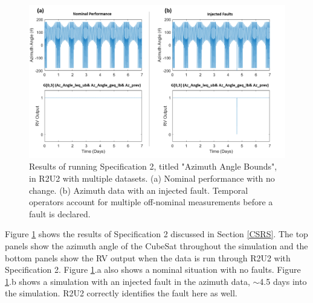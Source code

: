 \documentclass[conf]{new-aiaa}
\begin{document}
\begin{figure}[!ht]
\centering
\includegraphics[width=.8\textwidth]{Fig/Az_Spec2.png}
\caption{Results of running Specification 2, titled "Azimuth Angle Bounds", in R2U2 with multiple datasets. (a) Nominal performance with no change. (b) Azimuth data with an injected fault. Temporal operators account for multiple off-nominal measurements before a fault is declared.}
\label{AzAngle}
\end{figure}

Figure \ref{AzAngle} shows the results of Specification 2 discussed in Section \ref{CSRS}. The top panels show the azimuth angle of the CubeSat throughout the simulation and the bottom panels show the RV output when the data is run through R2U2 with Specification 2. Figure \ref{AzAngle}.a also shows a nominal situation with no faults. Figure \ref{AzAngle}.b shows a simulation with an injected fault in the azimuth data, $\sim$4.5 days into the simulation. R2U2 correctly identifies the fault here as well.

\end{document}
